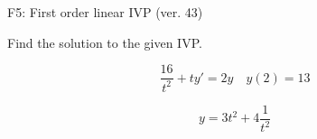 \begin{exercise}
  \begin{exerciseTitle}F5: First order linear IVP (ver. 43)\end{exerciseTitle}
  \begin{exerciseStatement}
    
Find the solution to the given IVP.

    
\[\frac{16}{t^{2}} +ty'= 2 y \hspace{1em} y( 2 ) = 13\]

  \end{exerciseStatement}
  \begin{exerciseAnswer}
    
\[y= 3 t^ 2 +4 \frac{1}{t^{2}}\]

  \end{exerciseAnswer}
\end{exercise}